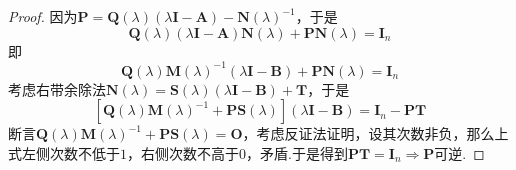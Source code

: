 {\begin{proof}
        因为$\bm{P}=
            \bm{Q}\left(\lambda\right)\left(\lambda\bm{I}-\bm{A}\right)-\bm{N}\left(\lambda\right)^{-1}
        $，于是
        \[
            \bm{Q}\left(\lambda\right)\left(\lambda\bm{I}-\bm{A}\right)\bm{N}\left(\lambda\right)+\bm{P}\bm{N}\left(\lambda\right)=\bm{I}_n
        \]即
        \[
            \bm{Q}\left(\lambda\right)\bm{M}\left(\lambda\right)^{-1}\left(\lambda\bm{I}-\bm{B}\right)+\bm{P}\bm{N}\left(\lambda\right)=\bm{I}_n
        \]考虑右带余除法$\bm{N}\left(\lambda\right)=\bm{S}\left(\lambda\right)\left(\lambda\bm{I}-\bm{B}\right)+\bm{T}$，于是
        \[
            \left[
                \bm{Q}\left(\lambda\right)\bm{M}\left(\lambda\right)^{-1}+\bm{PS}\left(\lambda\right)
                \right]\left(\lambda\bm{I}-\bm{B}\right)=\bm{I}_n-\bm{PT}
        \]断言$\bm{Q}\left(\lambda\right)\bm{M}\left(\lambda\right)^{-1}+\bm{PS}\left(\lambda\right)=\bm{O}$，考虑反证法证明，设其次数非负，那么上式左侧次数不低于$1$，右侧次数不高于$0$，矛盾.于是得到$\bm{PT}=\bm{I}_n\Longrightarrow \bm{P}$可逆.
    \end{proof}
}